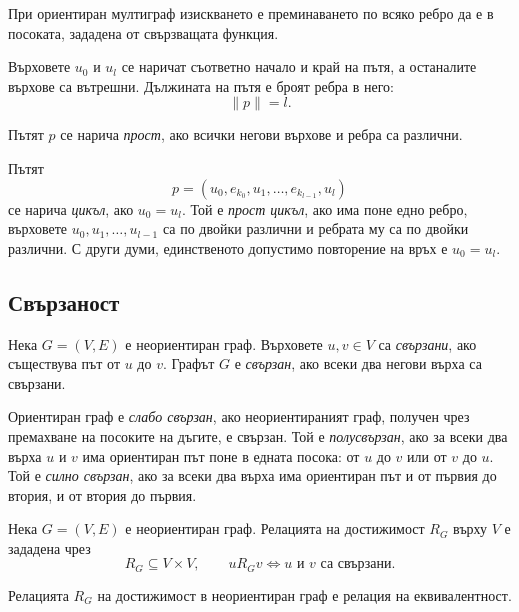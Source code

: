 При ориентиран мултиграф изискването е преминаването по всяко ребро да е в посоката, зададена от свързващата функция.

Върховете $u_0$ и $u_l$ се наричат съответно начало и край на пътя, а останалите върхове са вътрешни. Дължината на пътя е броят ребра в него:
\[
\lVert p\rVert=l.
\]

\begin{defn}
Пътят $p$ се нарича \emph{прост}, ако всички негови върхове и ребра са различни.
\end{defn}

\begin{defn}
Пътят
\[
p=(u_0,e_{k_0},u_1,\ldots,e_{k_{l-1}},u_l)
\]
се нарича \emph{цикъл}, ако $u_0=u_l$. Той е \emph{прост цикъл}, ако има поне едно ребро, върховете $u_0,u_1,\ldots,u_{l-1}$ са по двойки различни и ребрата му са по двойки различни. С други думи, единственото допустимо повторение на връх е $u_0=u_l$.
\end{defn}

\subsection{Свързаност}\label{s:3.3.2}

\begin{defn}
Нека $G=(V,E)$ е неориентиран граф. Върховете $u,v\in V$ са \emph{свързани}, ако съществува път от $u$ до $v$. Графът $G$ е \emph{свързан}, ако всеки два негови върха са свързани.
\end{defn}

\begin{defn}
Ориентиран граф е \emph{слабо свързан}, ако неориентираният граф, получен чрез премахване на посоките на дъгите, е свързан. Той е \emph{полусвързан}, ако за всеки два върха $u$ и $v$ има ориентиран път поне в едната посока: от $u$ до $v$ или от $v$ до $u$. Той е \emph{силно свързан}, ако за всеки два върха има ориентиран път и от първия до втория, и от втория до първия.
\end{defn}

\begin{defn}
Нека $G=(V,E)$ е неориентиран граф. Релацията на достижимост $R_G$ върху $V$ е зададена чрез
\[
R_G\subseteq V\times V,
\qquad
uR_Gv\Longleftrightarrow u\text{ и }v\text{ са свързани}.
\]
\end{defn}

\begin{prop}
Релацията $R_G$ на достижимост в неориентиран граф е релация на еквивалентност.
\end{prop}

